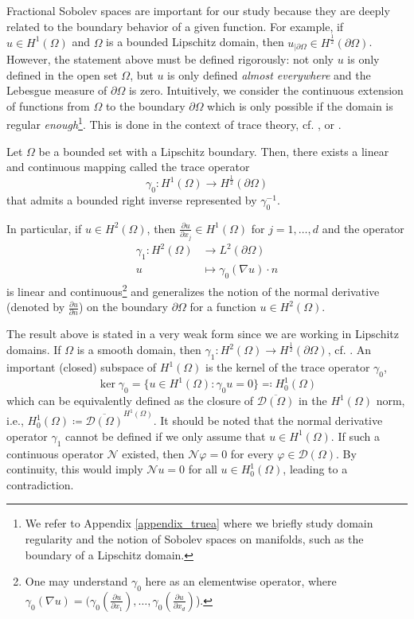 Fractional Sobolev spaces are important for our study because they are deeply related to the boundary behavior of a given function. For example, if \(u \in H^1(\Omega)\) and \(\Omega\) is a bounded Lipschitz domain, then \(u_{|\partial\Omega} \in H^\frac{1}{2}(\partial\Omega)\). However, the statement above must be defined rigorously: not only \(u\) is only defined in the open set \(\Omega\), but \(u\) is only defined \textit{almost everywhere} and the Lebesgue measure of \(\partial\Omega\) is zero. Intuitively, we consider the continuous extension of functions from \(\Omega\) to the boundary \(\partial\Omega\) which is only possible if the domain is regular \textit{enough}\footnote{We refer to Appendix \ref{appendix_truea} where we briefly study domain regularity and the notion of Sobolev spaces on manifolds, such as the boundary of a Lipschitz domain.}. This is done in the context of trace theory, cf. \cite{geymonat2007trace}, \cite{necas2011direct} or \cite{adams2003sobolev}.
\begin{theorem}\label{frac_theo}
    Let \(\Omega\) be a bounded set with a Lipschitz boundary. Then, there exists a linear and continuous mapping called the trace operator
    \[
    \gamma_0: H^1(\Omega) \rightarrow H^{\frac{1}{2}}(\partial\Omega)    
    \]
    that admits a bounded right inverse represented by \(\gamma_0^{-1}\).

    In particular, if \(u \in H^2(\Omega)\), then \(\frac{\partial u}{\partial x_j} \in H^1(\Omega)\) for \(j=1,\dots,d\) and the operator
    \begin{align*}
        \gamma_1: H^2(\Omega) &\rightarrow L^2(\partial\Omega)\\
        u &\mapsto \gamma_0(\nabla u)\cdot n
    \end{align*}
    is linear and continuous\footnote{One may understand \(\gamma_0\) here as an elementwise operator, where \(\gamma_0(\nabla u) = \Big(\gamma_0(\frac{\partial u}{\partial x_1}),\dots,\gamma_0(\frac{\partial u}{\partial x_d})\)\Big).} and generalizes the notion of the normal derivative (denoted by \(\frac{\partial u}{\partial n}\)) on the boundary \(\partial\Omega\) for a function \(u \in H^2(\Omega)\).  
\end{theorem}
The result above is stated in a very weak form since we are working in Lipschitz domains. If $\Omega$ is a smooth domain, then $\gamma_1: H^2(\Omega) \rightarrow H^{\frac{1}{2}}(\partial\Omega)$, cf. \cite{lions2012non}. An important (closed) subspace of \(H^1(\Omega)\) is the kernel of the trace operator \(\gamma_0\),
\[
    \ker \gamma_0 = \{u \in H^1(\Omega): \gamma_0 u = 0\} \eqqcolon H^1_0(\Omega)
\] 
which can be equivalently defined as the closure of \(\overline{\mathcal{D}(\Omega)}\) in the \(H^1(\Omega)\) norm, i.e.,  \(H^1_0(\Omega) \coloneqq \overline{\mathcal{D}(\Omega)}^{H^1(\Omega)}\). It should be noted that the normal derivative operator $\gamma_1$ cannot be defined if we only assume that $u \in H^1(\Omega)$. If such a continuous operator $\mathcal{N}$ existed, then $\mathcal{N}\varphi = 0$ for every $\varphi \in \mathcal{D}(\Omega)$. By continuity, this would imply $\mathcal{N}u=0$ for all $u \in H_0^1(\Omega)$, leading to a contradiction.

